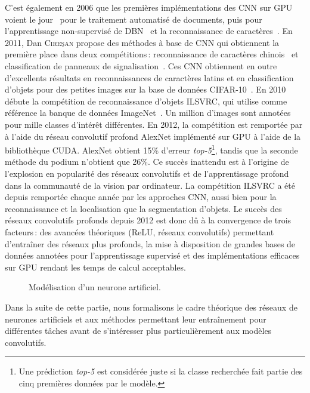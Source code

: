C'est également en 2006 que les premières implémentations des \gls{CNN} sur \gls{GPU} voient le jour~\cite{chellapilla_high_2006} pour le traitement automatisé de documents, puis pour l'apprentissage non-supervisé de \gls{DBN}~\cite{raina_large-scale_2009} et la reconnaissance de caractères~\cite{ciresan_deep_2010}. En 2011, Dan \textsc{Cire\c{s}an} propose des méthodes à base de \gls{CNN} qui obtiennent la première place dans deux compétitions\,: reconnaissance de caractères chinois~\cite{liu_icdar_2011} et classification de panneaux de signalisation~\cite{stallkamp_german_2011}. Ces \gls{CNN} obtiennent en outre d'excellents résultats en reconnaissances de caractères latins et en classification d'objets pour des petites images sur la base de données CIFAR-10~\cite{ciresan_multi-column_2012}. En 2010 débute la compétition de reconnaissance d'objets \gls{ILSVRC}, qui utilise comme référence la banque de données \gls{ImageNet}~\cite{deng_imagenet_2009}. Un million d'images sont annotées pour mille classes d'intérêt différentes. En 2012, la compétition est remportée par \citet*{krizhevsky_imagenet_2012} à l'aide du réseau convolutif profond AlexNet implémenté sur \gls{GPU} à l'aide de la bibliothèque \gls{CUDA}. AlexNet obtient 15\% d'erreur \emph{top-5}\footnote{Une prédiction \emph{top-5} est considérée juste si la classe recherchée fait partie des cinq premières données par le modèle.}, tandis que la seconde méthode du podium n'obtient que 26\%. Ce succès inattendu est à l'origine de l'explosion en popularité des réseaux convolutifs et de l'apprentissage profond dans la communauté de la vision par ordinateur. La compétition \gls{ILSVRC} a été depuis remportée chaque année par les approches \gls{CNN}, aussi bien pour la reconnaissance et la localisation que la segmentation d'objets. Le succès des réseaux convolutifs profonds depuis 2012 est donc dû à la convergence de trois facteurs\,: des avancées théoriques (\gls{ReLU}, réseaux convolutifs) permettant d'entraîner des réseaux plus profonds, la mise à disposition de grandes bases de données annotées pour l'apprentissage supervisé et des implémentations efficaces sur \gls{GPU} rendant les temps de calcul acceptables.

\begin{figure}[t]
  \resizebox{\textwidth}{!}{
  
  }
\caption{Modélisation d'un neurone artificiel.}
\label{fig:neurone}
\end{figure}

Dans la suite de cette partie, nous formalisons le cadre théorique des réseaux de neurones artificiels et aux méthodes permettant leur entraînement pour différentes tâches avant de s'intéresser plus particulièrement aux modèles convolutifs.

